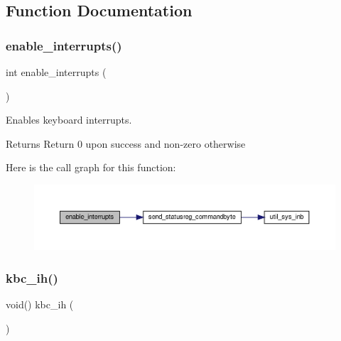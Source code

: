 \subsection{Function Documentation}
\mbox{\label{group__Keyboard_ga4909d2b8687b61065a2ce1d215135c3e}} 
\subsubsection{\texorpdfstring{enable\+\_\+interrupts()}{enable\_interrupts()}}
{\footnotesize\ttfamily int enable\+\_\+interrupts (\begin{DoxyParamCaption}{ }\end{DoxyParamCaption})}



Enables keyboard interrupts. 

\begin{DoxyReturn}{Returns}
Return 0 upon success and non-\/zero otherwise 
\end{DoxyReturn}
Here is the call graph for this function\+:\nopagebreak
\begin{figure}[H]
\begin{center}
\leavevmode
\includegraphics[width=350pt]{group__Keyboard_ga4909d2b8687b61065a2ce1d215135c3e_cgraph}
\end{center}
\end{figure}
\mbox{\label{group__Keyboard_gaea970a154161a35f6894898a092ed70a}} 
\subsubsection{\texorpdfstring{kbc\+\_\+ih()}{kbc\_ih()}}
{\footnotesize\ttfamily void() kbc\+\_\+ih (\begin{DoxyParamCaption}{ }\end{DoxyParamCaption})}



